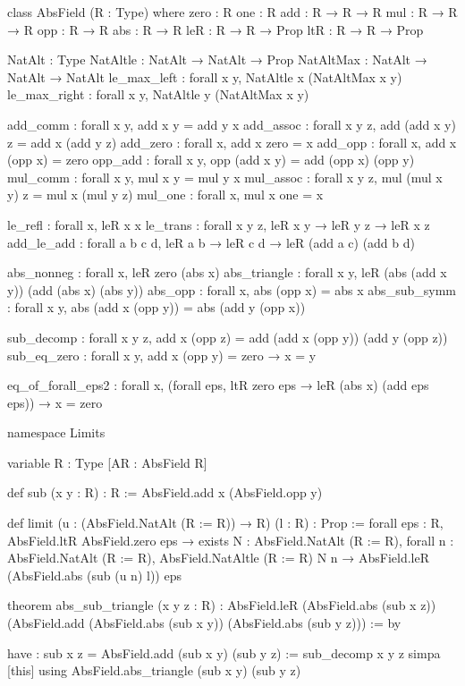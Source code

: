 \documentclass{article}
\theoremstyle{plain}
\theoremstyle{definition}
\theoremstyle{remark}
\begin{document}
	\begin{rocq}
		class AbsField (R : Type) where
		zero  : R
		one   : R
		add   : R → R → R
		mul   : R → R → R
		opp   : R → R
		abs   : R → R
		leR    : R → R → Prop
		ltR    : R → R → Prop
		
		
		NatAlt     : Type
		NatAltle   : NatAlt → NatAlt → Prop
		NatAltMax  : NatAlt → NatAlt → NatAlt
		le_max_left  : forall x y, NatAltle x (NatAltMax x y)
		le_max_right : forall x y, NatAltle y (NatAltMax x y)
		
		add_comm  : forall x y, add x y = add y x
		add_assoc : forall x y z, add (add x y) z = add x (add y z)
		add_zero  : forall x, add x zero = x
		add_opp   : forall x, add x (opp x) = zero
		opp_add   : forall x y, opp (add x y) = add (opp x) (opp y)
		mul_comm  : forall x y, mul x y = mul y x
		mul_assoc : forall x y z, mul (mul x y) z = mul x (mul y z)
		mul_one   : forall x, mul x one = x
		
		le_refl   : forall x, leR x x
		le_trans  : forall x y z, leR x y → leR y z → leR x z
		add_le_add : forall a b c d, leR a b → leR c d → leR (add a c) 
		(add b d)
		
		abs_nonneg : forall x, leR zero (abs x)
		abs_triangle : forall x y, leR (abs (add x y)) (add (abs x) (abs y))
		abs_opp : forall x, abs (opp x) = abs x
		abs_sub_symm : forall x y, abs (add x (opp y)) = abs (add y (opp x))
		
		sub_decomp : forall x y z, add x (opp z) = add (add x (opp y)) 
		(add y (opp z))
		sub_eq_zero : forall x y, add x (opp y) = zero → x = y
		
		eq_of_forall_eps2 : forall x, (forall eps, ltR zero eps → leR (abs x) 
		(add eps eps)) → x = zero
		
		namespace Limits
		
		variable {R : Type} [AR : AbsField R]
		
		def sub (x y : R) : R := AbsField.add x (AbsField.opp y)
		
		def limit (u : (AbsField.NatAlt (R := R)) → R) (l : R) : Prop :=
		forall eps : R, AbsField.ltR AbsField.zero eps →
		exists N : AbsField.NatAlt (R := R),
		forall n : AbsField.NatAlt (R := R),
		AbsField.NatAltle (R := R) N n →
		AbsField.leR (AbsField.abs (sub (u n) l)) eps
		
		theorem abs_sub_triangle (x y z : R) :
		AbsField.leR (AbsField.abs (sub x z)) (AbsField.add (AbsField.abs 
		(sub x y)) (AbsField.abs (sub y z))) := by
		
		have : sub x z = AbsField.add (sub x y) (sub y z) := sub_decomp x y z
		simpa [this] using AbsField.abs_triangle (sub x y) (sub y z)
		

\end{rocq}
\end{document}
